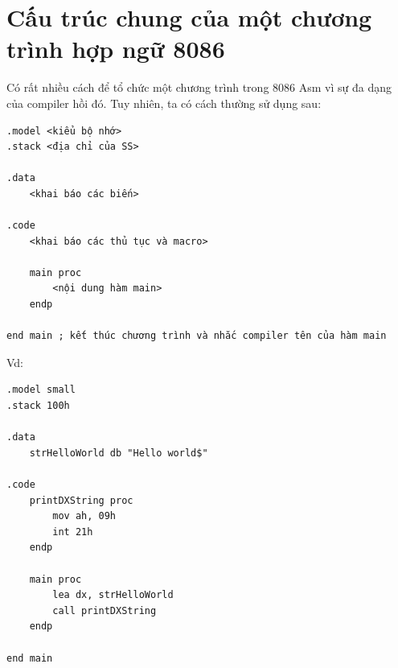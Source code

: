 \documentclass[main.tex]{subfiles}
\begin{document}

\section{Cấu trúc chung của một chương trình hợp ngữ 8086}
Có rất nhiều cách để tổ chức một chương trình trong 8086 Asm vì sự đa dạng của compiler hồi đó. Tuy nhiên, ta có cách thường sử dụng sau:

\begin{verbatim}
.model <kiểu bộ nhớ>
.stack <địa chỉ của SS>

.data
    <khai báo các biến>

.code 
    <khai báo các thủ tục và macro>

    main proc 
        <nội dung hàm main>
    endp

end main ; kết thúc chương trình và nhắc compiler tên của hàm main
\end{verbatim}
Vd: 
\begin{verbatim}
.model small
.stack 100h

.data
    strHelloWorld db "Hello world$"

.code 
    printDXString proc 
        mov ah, 09h
        int 21h
    endp

    main proc 
        lea dx, strHelloWorld
        call printDXString
    endp

end main 
\end{verbatim}
\end{document}
